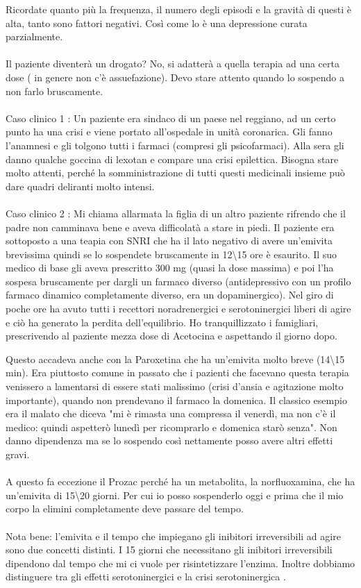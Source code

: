 Ricordate quanto più la frequenza, il numero degli episodi e la gravità
di questi è alta, tanto sono fattori negativi. Così come lo è una
depressione curata parzialmente.
\\\\
Il paziente diventerà un drogato? No, si adatterà a quella terapia ad
una certa dose ( in genere non c'è assuefazione). Devo stare attento
quando lo sospendo a non farlo bruscamente.
\\\\
Caso clinico 1 : Un paziente era sindaco di un paese nel reggiano, ad un
certo punto ha una crisi e viene portato all'ospedale in unità
coronarica. Gli fanno l'anamnesi e gli tolgono tutti i farmaci (compresi
gli psicofarmaci). Alla sera gli danno qualche goccina di lexotan e
compare una crisi epilettica. Bisogna stare molto attenti, perché la
somministrazione di tutti questi medicinali insieme può dare quadri
deliranti molto intensi.
\\\\
Caso clinico 2 : Mi chiama allarmata la figlia di un altro paziente
rifrendo che il padre non camminava bene e aveva difficolatà a stare in
piedi. Il paziente era sottoposto a una teapia con SNRI che ha il lato
negativo di avere un'emivita brevissima quindi se lo sospendete
bruscamente in 12\textbackslash{}15 ore è esaurito. Il suo medico di
base gli aveva prescritto 300 mg (quasi la dose massima) e poi l'ha
sospesa bruscamente per dargli un farmaco diverso (antidepressivo con un
profilo farmaco dinamico completamente diverso, era un dopaminergico).
Nel giro di poche ore ha avuto tutti i recettori noradrenergici e
serotoninergici liberi di agire e ciò ha generato la perdita
dell'equilibrio. Ho tranquillizzato i famigliari, prescrivendo al
paziente mezza dose di Acetocina e aspettando il giorno dopo.

Questo accadeva anche con la Paroxetina che ha un'emivita molto breve
(14\textbackslash{}15 min). Era piuttosto comune in passato che i
pazienti che facevano questa terapia venissero a lamentarsi di essere
stati malissimo (crisi d'ansia e agitazione molto importante), quando
non prendevano il farmaco la domenica. Il classico esempio era il malato
che diceva "mi è rimasta una compressa il venerdì, ma non c'è il medico:
quindi aspetterò lunedì per ricomprarlo e domenica starò senza". Non
danno dipendenza ma se lo sospendo così nettamente posso avere altri
effetti gravi.
\\\\
A questo fa eccezione il Prozac perché ha un metabolita, la
norfluoxamina, che ha un'emivita di 15\textbackslash{}20 giorni. Per cui
io posso sospenderlo oggi e prima che il mio corpo la elimini
completamente deve passare del tempo.
\\\\
Nota bene: l'emivita e il tempo che impiegano gli inibitori
irreversibili ad agire sono due concetti distinti. I 15 giorni che
necessitano gli inibitori irreversibili dipendono dal tempo che mi ci
vuole per risintetizzare l'enzima. Inoltre dobbiamo distinguere tra gli
effetti serotoninergici e la crisi serotoninergica .

